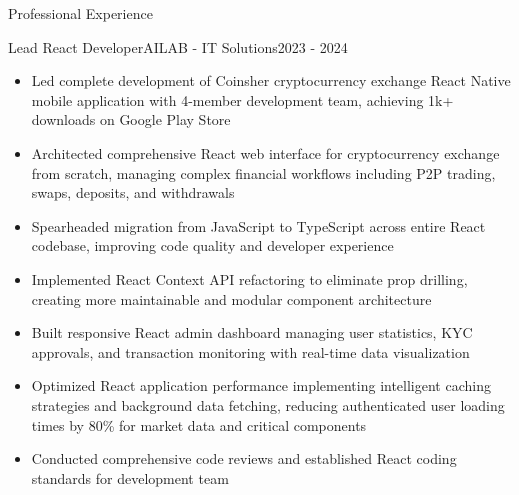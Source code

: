 \documentclass[]{mcdowellcv}
\begin{document}
\begin{cvsection}{Professional Experience}
		\begin{cvsubsection}{Lead React Developer}{AILAB - IT Solutions}{2023 - 2024}
			\begin{itemize}
				\item Led complete development of Coinsher cryptocurrency exchange React Native mobile application with 4-member development team, achieving 1k+ downloads on Google Play Store
				\item Architected comprehensive React web interface for cryptocurrency exchange from scratch, managing complex financial workflows including P2P trading, swaps, deposits, and withdrawals
				\item Spearheaded migration from JavaScript to TypeScript across entire React codebase, improving code quality and developer experience
				\item Implemented React Context API refactoring to eliminate prop drilling, creating more maintainable and modular component architecture
				\item Built responsive React admin dashboard managing user statistics, KYC approvals, and transaction monitoring with real-time data visualization
				\item Optimized React application performance implementing intelligent caching strategies and background data fetching, reducing authenticated user loading times by 80\% for market data and critical components
				\item Conducted comprehensive code reviews and established React coding standards for development team
			\end{itemize}
		\end{cvsubsection}
		

\end{cvsection}
\end{document}
